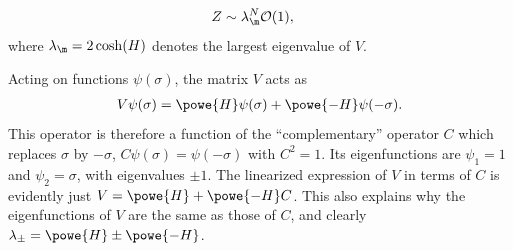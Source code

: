 \documentclass[english, parskip=full]{scrartcl}
\begin{document}
\begin{align}
Z &\sim \lambda_\m^N \mathcal{O}(1),
\end{align}
where $\lambda_\m = 2\cosh(H)$ denotes the largest eigenvalue of $V$.

Acting on functions $\psi(\sigma)$, the matrix $V$ acts as
\begin{align}
V\psi(\sigma) = \powe{H}\psi(\sigma) + \powe{-H}\psi(-\sigma).
\end{align}
This operator is therefore a function of the ``complementary'' operator $C$ which replaces $\sigma$ by $-\sigma$, $C\psi(\sigma) = \psi(-\sigma)$ with $C^2=1$.
Its eigenfunctions are $\psi_1 = 1$ and $\psi_2 = \sigma$, with eigenvalues $\pm 1$.
The linearized expression of $V$ in terms of $C$ is evidently just $V= \powe{H} + \powe{-H}C$.
This also explains why the eigenfunctions of $V$ are the same as those of $C$, and clearly $\lambda_\pm = \powe{H} \pm \powe{-H}$.
\end{document}
